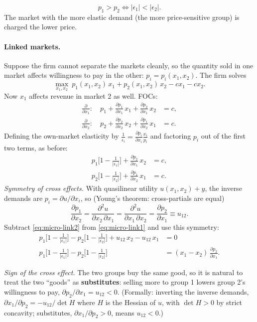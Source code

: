 \begin{keybox}[title=Inverse-elasticity rule]
\[
p_1>p_2\iff|\epsilon_1|<|\epsilon_2| .
\]
The market with the more elastic demand (the more price-sensitive group) is charged the lower price.
\end{keybox}

\paragraph{Linked markets.} Suppose the firm cannot separate the markets cleanly, so the quantity sold in one market affects willingness to pay in the other: $p_i=p_i(x_1,x_2)$. The firm solves
\[
\max_{x_1,x_2}\ p_1(x_1,x_2)\,x_1+p_2(x_1,x_2)\,x_2-cx_1-cx_2 .
\]
Now $x_1$ affects revenue in market 2 as well. FOCs:
\begin{align*}
\frac{\partial}{\partial x_1}:\quad p_1+\frac{\partial p_1}{\partial x_1}\,x_1+\frac{\partial p_2}{\partial x_1}\,x_2&=c,\\
\frac{\partial}{\partial x_2}:\quad p_2+\frac{\partial p_2}{\partial x_2}\,x_2+\frac{\partial p_1}{\partial x_2}\,x_1&=c.
\end{align*}
Defining the own-market elasticity by $\frac{1}{\epsilon_i}=\frac{\partial p_i}{\partial x_i}\frac{x_i}{p_i}$ and factoring $p_i$ out of the first two terms, as before:
\begin{align}
p_1\Big[1-\frac{1}{|\epsilon_1|}\Big]+\frac{\partial p_2}{\partial x_1}\,x_2&=c, \label{eq:micro-link1}\\
p_2\Big[1-\frac{1}{|\epsilon_2|}\Big]+\frac{\partial p_1}{\partial x_2}\,x_1&=c. \label{eq:micro-link2}
\end{align}
\emph{Symmetry of cross effects.} With quasilinear utility $u(x_1,x_2)+y$, the inverse demands are $p_i=\partial u/\partial x_i$, so (Young's theorem: cross-partials are equal)
\[
\frac{\partial p_1}{\partial x_2}=\frac{\partial^2u}{\partial x_2\,\partial x_1}=\frac{\partial^2u}{\partial x_1\,\partial x_2}=\frac{\partial p_2}{\partial x_1}\equiv u_{12}.
\]
Subtract \eqref{eq:micro-link2} from \eqref{eq:micro-link1} and use this symmetry:
\begin{align*}
p_1\Big[1-\tfrac{1}{|\epsilon_1|}\Big]-p_2\Big[1-\tfrac{1}{|\epsilon_2|}\Big]+u_{12}\,x_2-u_{12}\,x_1&=0\\
p_1\Big[1-\tfrac{1}{|\epsilon_1|}\Big]-p_2\Big[1-\tfrac{1}{|\epsilon_2|}\Big]&=(x_1-x_2)\,\frac{\partial p_2}{\partial x_1}.
\end{align*}

\emph{Sign of the cross effect.} The two groups buy the same good, so it is natural to treat the two ``goods'' as \textbf{substitutes}: selling more to group 1 lowers group 2's willingness to pay, $\partial p_2/\partial x_1=u_{12}<0$. (Formally: inverting the inverse demands, $\partial x_1/\partial p_2=-u_{12}/\det H$ where $H$ is the Hessian of $u$, with $\det H>0$ by strict concavity; substitutes, $\partial x_1/\partial p_2>0$, means $u_{12}<0$.)

